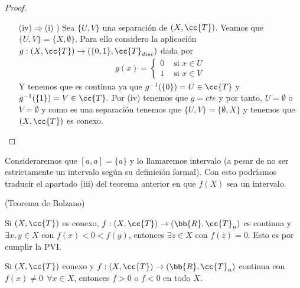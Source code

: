 \begin{teo}
\begin{proof}
\begin{itemize}
            \item[(iv)$\Rightarrow$(i) )] Sea $\{U,V\}$ una separación de $(X, \cc{T})$. Veamos que $\{U,V\}=\{X, \emptyset\}$. Para ello considero la aplicación $g:(X, \cc{T})\to (\{0,1\}, \cc{T}_{disc})$ dada por 
            \begin{align*}
                g(x)=\left\{
                    \begin{array}{ccc}
                        0 & \text{ si } x\in U\\
                        1 & \text{ si } x \in V
                    \end{array}
                \right.
            \end{align*}
            Y tenemos que es continua ya que $g^{-1}(\{0\})=U\in \cc{T}$ y $g^{-1}(\{1\})=V\in \cc{T}$. Por (iv) tenemos que $g=cte$ y por tanto, $U =\emptyset$ o $V=\emptyset$ y como es una separación tenemos que $\{U,V\}=\{\emptyset, X\}$ y tenemos que $(X, \cc{T})$ es conexo.
        \end{itemize}
    \end{proof}
\end{teo}

\begin{observacion}
    Consideraremos que $[a,a]=\{a\}$ y lo llamaremos intervalo (a pesar de no ser estrictamente un intervalo según su definición formal). Con esto podríamos traducir el apartado (iii) del teorema anterior en que $f(X)$ sea un intervalo.
    \endsquare
\end{observacion}

\begin{coro}
    (Teorema de Bolzano)
    
    Si $(X, \cc{T})$ es conexo, $f:(X, \cc{T})\to (\bb{R}, \cc{T}_u)$ es continua y $\exists x,y\in X$ con $f(x)<0<f(y)$, entonces $\exists z \in X$ con $f(z)=0$. Esto es por cumplir la PVI.
    \endsquare
\end{coro}

\begin{coro}
    Si $(X, \cc{T})$ conexo y $f:(X, \cc{T})\to (\bb{R}, \cc{T}_u)$ continua con $f(x)\neq 0\ \ \forall x \in X$, entonces $f>0$ o $f<0$ en todo $X$.
    \endsquare
\end{coro}

